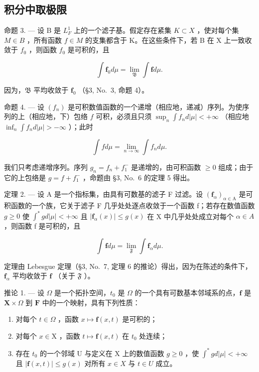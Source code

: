 \subsection{积分中取极限}

命题 3. --- 设 B 是 \(L_{F}^{1}\) 上的一个滤子基。假定存在紧集 \(K \subset X\) ，使对每个集 \(M \in B\) ，所有函数 \(f \in M\) 的支集都含于 K。在这些条件下，若 B 在 X 上一致收敛于 \(f_{0}\) ，则函数 \(f_{0}\) 是可积的，且

\[
\int \mathbf {f} _ {0} d \mu = \lim _ {\mathfrak {B}} \int \mathbf {f} d \mu .\tag{9}
\]

因为，\(\mathfrak{B}\) 平均收敛于 \(\mathbf{f}_0\) （§3, No.~3, 命题 4）。

命题 4. --- 设 \((f_n)\) 是可积数值函数的一个递增（相应地，递减）序列。为使序列的上（相应地，下）包络 \(f\) 可积，必须且只须 \(\sup_{n} \int f_n d|\mu| < +\infty\) （相应地 \(\inf_{n} \int f_n d|\mu| > -\infty\) ）；此时

\[
\int f d \mu = \lim _ {n \to \infty} \int f _ {n} d \mu .\tag{10}
\]

我们只考虑递增序列。序列 \(g_{n} = f_{n} + f_{1}^{-}\) 是递增的，由可积函数 \(\geqslant 0\) 组成；由于它的上包络是 \(g = f + f_{1}^{-}\) ，命题由 §3, No.~6 的定理 5 得出。

定理 2. --- 设 A 是一个指标集，由具有可数基的滤子 F 过滤。设 \((\mathbf{f}_{\alpha})_{\alpha\in\mathrm{A}}\) 是可积函数的一个族，它关于滤子 F 几乎处处逐点收敛于一个函数 f；若存在数值函数 \(g\geqslant0\) 使 \(\int^{*}gd|\mu|<+\infty\) 且 \(|\mathbf{f}_{\alpha}(x)|\leqslant g(x)\) 在 X 中几乎处处成立对每个 \(\alpha\in A\) ，则函数 f 是可积的，且

\[
\int \mathbf {f} d \mu = \lim _ {\mathfrak {F}} \int \mathbf {f} _ {\alpha} d \mu .\tag{11}
\]

定理由 Lebesgue 定理（§3, No.~7, 定理 6 的推论）得出，因为在陈述的条件下，\(\mathbf{f}_{\alpha}\) 平均收敛于 \(\mathbf{f}\) （关于 \(\mathfrak{F}\) ）。

推论 1. --- 设 \(\Omega\) 是一个拓扑空间，\(t_0\) 是 \(\Omega\) 的一个具有可数基本邻域系的点，\(\mathbf{f}\) 是 \(\mathbf{X} \times \Omega\) 到 \(\mathbf{F}\) 中的一个映射，具有下列性质：

\begin{enumerate}
\def\labelenumi{\alph{enumi})}
\item
  对每个 \(t \in \Omega\) ，函数 \(x \mapsto \mathbf{f}(x, t)\) 是可积的；
\item
  对每个 \(x \in \mathrm{X}\) ，函数 \(t \mapsto \mathbf{f}(x, t)\) 在 \(t_0\) 处连续；
\item
  存在 \(t_0\) 的一个邻域 U 与定义在 X 上的数值函数 \(g \geqslant 0\) ，使 \(\int^{*} g d|\mu| < +\infty\) 且 \(|\mathbf{f}(x,t)| \leqslant g(x)\) 对所有 \(x \in X\) 与 \(t \in U\) 成立。
\end{enumerate}

